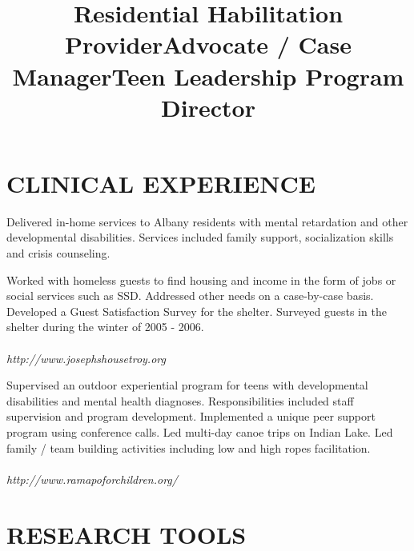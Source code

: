 \documentclass[line, margin, 10pt]{res}
\begin{document}
\begin{resume}
  \section{CLINICAL EXPERIENCE}

  \title{Residential Habilitation Provider}
  \begin{position}
    Delivered in-home services to Albany residents with mental
    retardation and other developmental disabilities. Services included
    family support, socialization skills and crisis counseling.
  \end{position}

  \title{Advocate / Case Manager}
  \begin{position}
    Worked with homeless guests to find housing and income in the form
    of jobs or social services such as SSD. Addressed other needs on a case-by-case
    basis. Developed a Guest Satisfaction Survey for the shelter. Surveyed
    guests in the shelter during the winter of 2005 - 2006. \\ \\
    \emph{http://www.josephshousetroy.org}
  \end{position}

  \title{Teen Leadership Program Director}
  \begin{position}
    Supervised an outdoor experiential program for teens with
    developmental disabilities and mental health
    diagnoses. Responsibilities included staff supervision and program
    development. Implemented a unique peer support program using
    conference calls. Led multi-day canoe trips on Indian Lake. Led family
    / team building activities including low and high ropes
    facilitation. \\ \\
    \emph{http://www.ramapoforchildren.org/}
  \end{position}

  \section{RESEARCH TOOLS}


\end{resume}
\end{document}
